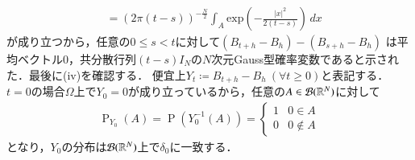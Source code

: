 \begin{prf}
\begin{description}
\begin{align}
			&= (2\pi(t-s))^{-\frac{N}{2}} \int_{A} \mathrm{exp}\left( -\frac{|x|^2}{2(t-s)} \right)\, dx
		\end{align}
		が成り立つから，任意の$0 \leq s < t$に対して$(B_{t+h} - B_h) - (B_{s+h} - B_h) $
		は平均ベクトル0，共分散行列$(t-s)I_N$の$N$次元Gauss型確率変数であると示された．最後に(iv)を確認する．
		便宜上$Y_t \coloneqq B_{t+h} - B_h\ (\forall t \geq 0)$と表記する．
		$t=0$の場合$\Omega$上で$Y_0 = 0$が成り立っているから，任意の$A \in \mathcal{B}(\mathbb{R}^N)$に対して
		\begin{align}
			\operatorname{P}_{Y_0}(A) 
			= \operatorname{P}\left(Y_0^{-1}(A)\right) 
			= \begin{cases}
				1 & 0 \in A \\
				0 & 0 \notin A
			\end{cases}
		\end{align}
		となり，$Y_0$の分布は$\mathcal{B}(\mathbb{R}^N)$上で$\delta_0$に一致する．
		\QED
	

\end{description}
\end{prf}
